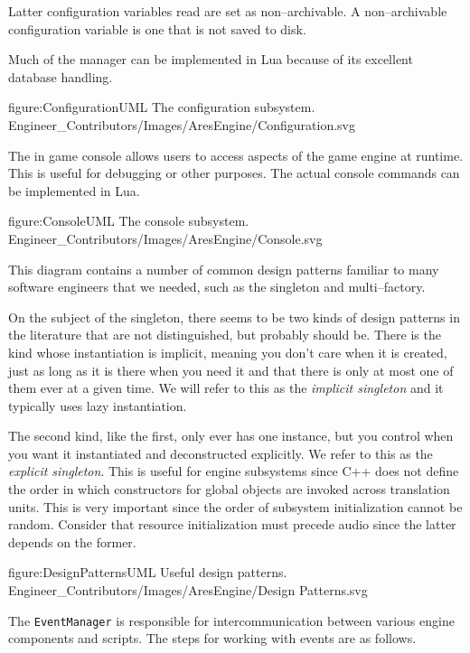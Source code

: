 Latter configuration variables read are set as non--archivable. A non--archivable configuration variable is one that is not saved to disk.

Much of the manager can be implemented in Lua because of its excellent database handling.

\FullPageDiagram
    {figure:ConfigurationUML}
    {The configuration subsystem.}
    {Engineer_Contributors/Images/AresEngine/Configuration.svg}

\page
{}
The in game console allows users to access aspects of the game engine at runtime. This is useful for debugging or other purposes. The actual console commands can be implemented in Lua.

\FullPageDiagram
    {figure:ConsoleUML}
    {The console subsystem.}
    {Engineer_Contributors/Images/AresEngine/Console.svg}

\page
{}
This diagram contains a number of common design patterns familiar to many software engineers that we needed, such as the singleton and multi--factory.

On the subject of the singleton, there seems to be two kinds of design patterns in the literature that are not distinguished, but probably should be. There is the kind whose instantiation is implicit, meaning you don't care when it is created, just as long as it is there when you need it and that there is only at most one of them ever at a given time. We will refer to this as the {\it implicit singleton} and it typically uses lazy instantiation.

The second kind, like the first, only ever has one instance, but you control when you want it instantiated and deconstructed explicitly. We refer to this as the {\it explicit singleton}. This is useful for engine subsystems since C++ does not define the order in which constructors for global objects are invoked across translation units. This is very important since the order of subsystem initialization cannot be random. Consider that resource initialization must precede audio since the latter depends on the former.

\FullPageDiagram
    {figure:DesignPatternsUML}
    {Useful design patterns.}
    {Engineer_Contributors/Images/AresEngine/Design Patterns.svg}

\page 
{}
The {\tt EventManager} is responsible for intercommunication between various engine components and scripts. The steps for working with events are as follows.

